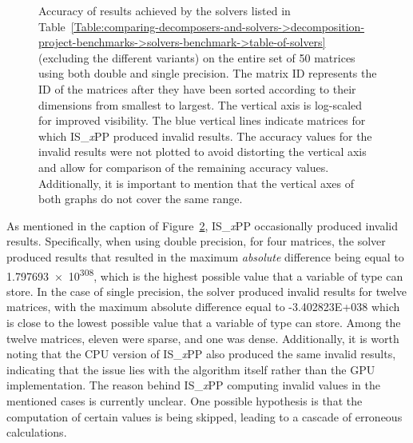 \begin{figure}[ht!]
\begin{subfigure}{\textwidth}
		\label{Figure:comparing-decomposers-and-solvers->decomposition-project-benchmarks->solvers-benchmark->accuracy-of-results-on-all-matrices->single-precision}
	\end{subfigure}
	\caption{Accuracy of results achieved by the solvers listed in Table~\ref{Table:comparing-decomposers-and-solvers->decomposition-project-benchmarks->solvers-benchmark->table-of-solvers} (excluding the different variants) on the entire set of 50 matrices using both double and single precision. The matrix ID represents the ID of the matrices after they have been sorted according to their dimensions from smallest to largest. The vertical axis is log-scaled for improved visibility. The blue vertical lines indicate matrices for which IS\_\textit{x}PP produced invalid results. The accuracy values for the invalid results were not plotted to avoid distorting the vertical axis and allow for comparison of the remaining accuracy values. Additionally, it is important to mention that the vertical axes of both graphs do not cover the same range.}
	\label{Figure:comparing-decomposers-and-solvers->decomposition-project-benchmarks->solvers-benchmark->accuracy-of-results-on-all-matrices->double-and-single-precision}
\end{figure}

As mentioned in the caption of Figure~\ref{Figure:comparing-decomposers-and-solvers->decomposition-project-benchmarks->solvers-benchmark->accuracy-of-results-on-all-matrices->double-and-single-precision}, IS\_\textit{x}PP occasionally produced invalid results. Specifically, when using double precision, for four matrices, the solver produced results that resulted in the maximum \textit{absolute} difference being equal to \num{1.797693e+308}, which is the highest possible value that a variable of type  can store. In the case of single precision, the solver produced invalid results for twelve matrices, with the maximum absolute difference equal to \num{-3.402823E+038} which is close to the lowest possible value that a variable of type  can store. Among the twelve matrices, eleven were sparse, and one was dense. Additionally, it is worth noting that the CPU version of IS\_\textit{x}PP also produced the same invalid results, indicating that the issue lies with the algorithm itself rather than the GPU implementation. The reason behind IS\_\textit{x}PP computing invalid values in the mentioned cases is currently unclear. One possible hypothesis is that the computation of certain values is being skipped, leading to a cascade of erroneous calculations.

